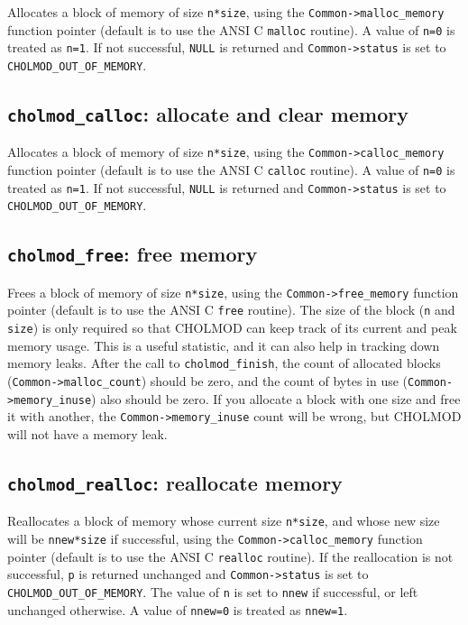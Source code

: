 \documentclass[11pt]{article}
\begin{document}

Allocates a block of memory of size {\tt n*size},
using the {\tt Common->malloc\_memory}
function pointer (default is to use the ANSI C {\tt malloc} routine).
A value of {\tt n=0} is treated as {\tt n=1}.
If not successful, {\tt NULL} is returned and {\tt Common->status} is set to {\tt CHOLMOD\_OUT\_OF\_MEMORY}.

\subsection{{\tt cholmod\_calloc}: allocate and clear memory}


Allocates a block of memory of size {\tt n*size},
using the {\tt Common->calloc\_memory}
function pointer (default is to use the ANSI C {\tt calloc} routine).
A value of {\tt n=0} is treated as {\tt n=1}.
If not successful, {\tt NULL} is returned and {\tt Common->status} is set to {\tt CHOLMOD\_OUT\_OF\_MEMORY}.

\newpage \subsection{{\tt cholmod\_free}: free memory}


Frees a block of memory of size {\tt n*size},
using the {\tt Common->free\_memory}
function pointer (default is to use the ANSI C {\tt free} routine).
The size of the block ({\tt n} and {\tt size}) is only required so that CHOLMOD
can keep track of its current and peak memory usage.  This is a useful statistic,
and it can also help in tracking down memory leaks.  After the call to
{\tt cholmod\_finish}, the count of allocated blocks ({\tt Common->malloc\_count})
should be zero, and the count of bytes in use ({\tt Common->memory\_inuse}) also
should be zero.  If you allocate a block with one size and free it with another,
the {\tt Common->memory\_inuse} count will be wrong, but CHOLMOD will not
have a memory leak.

\subsection{{\tt cholmod\_realloc}: reallocate memory}


Reallocates a block of memory whose current size {\tt n*size},
and whose new size will be {\tt nnew*size} if successful,
using the {\tt Common->calloc\_memory}
function pointer (default is to use the ANSI C {\tt realloc} routine).
If the reallocation is not successful, {\tt p} is returned unchanged
and {\tt Common->status} is set to {\tt CHOLMOD\_OUT\_OF\_MEMORY}.
The value of {\tt n} is set to {\tt nnew} if successful, or left
unchanged otherwise.
A value of {\tt nnew=0} is treated as {\tt nnew=1}.
\end{document}
